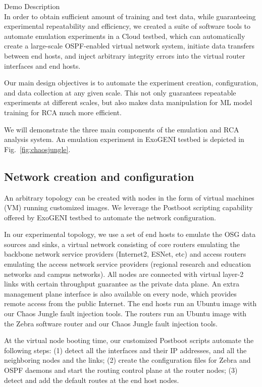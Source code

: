 \hfill \break

{\LARGE Demo Description}\\

In order to obtain sufficient amount of training and test data, while guaranteeing experimental repeatability and efficiency, we created a suite of software tools to automate emulation experiments in a Cloud testbed, which can automatically create a large-scale OSPF-enabled virtual network system, initiate data transfers between end hosts, and inject arbitrary integrity errors into the virtual router interfaces and end hosts.  

Our main design objectives is to automate the experiment creation, configuration, and data collection at any given scale. This not only guarantees repeatable experiments at different scales, but also makes data manipulation for ML model training for RCA much more efficient.   

We will demonstrate the three main components of the emulation and RCA analysis system. An emulation experiment in ExoGENI testbed is depicted in Fig.~\ref{fig:chaosjungle}.

\subsection{Network creation and configuration}
An arbitrary topology can be created with nodes in the form of virtual machines (VM) running customized images. We leverage the Postboot scripting capability offered by ExoGENI testbed to automate the network configuration.  

In our experimental topology, we use a set of end hosts to emulate the OSG data sources and sinks, a virtual network consisting of core routers emulating the backbone network service providers (Internet2, ESNet, etc) and access routers emulating the access network service providers (regional research and education networks and campus networks). All nodes are connected with virtual layer-2 links with certain throughput guarantee as the private data plane. An extra management plane interface is also available on every node, which provides remote access from the public Internet. The end hosts run an Ubuntu image with our Chaos Jungle fault injection tools. The routers run an Ubuntu image with the Zebra software router and our Chaos Jungle fault injection tools.

At the virtual node booting time, our customized Postboot scripts automate the following steps: (1) detect all the interfaces and their IP addresses, and all the neighboring nodes and the links; (2) create the configuration files for Zebra and OSPF daemons and start the routing control plane at the router nodes; (3) detect and add the default routes at the end host nodes.    

